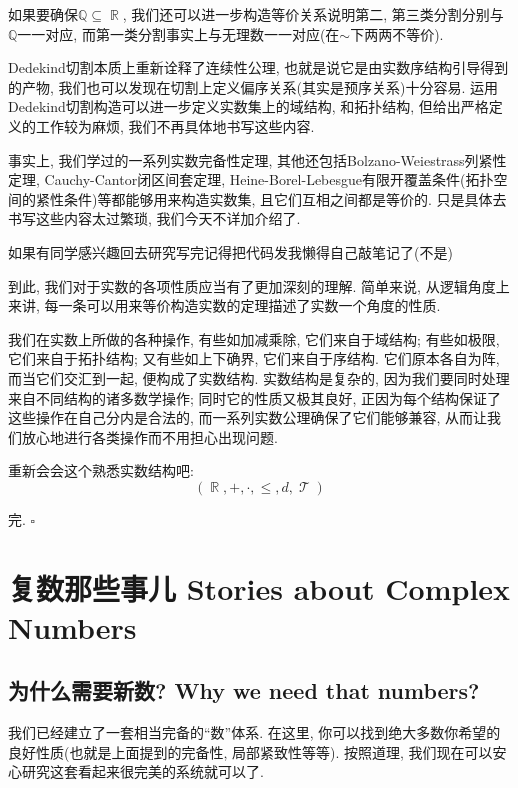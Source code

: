 \documentclass[UTF8]{ctexart}
\newcommand{\<}{\langle}
\renewcommand{\>}{\rangle}
\DeclareMathOperator{\R}{\mathbb{R}}
\DeclareMathOperator{\T}{\mathcal{T}}
\begin{document}
            如果要确保$\mathbb{Q}\subseteq\R$, 我们还可以进一步构造等价关系说明第二, 第三类分割分别与$\mathbb{Q}$一一对应, 而第一类分割事实上与无理数一一对应(在$\sim$下两两不等价). 

            Dedekind切割本质上重新诠释了连续性公理, 也就是说它是由实数序结构引导得到的产物, 我们也可以发现在切割上定义偏序关系(其实是预序关系)十分容易. 运用Dedekind切割构造可以进一步定义实数集上的域结构, 和拓扑结构, 但给出严格定义的工作较为麻烦, 我们不再具体地书写这些内容. 

            事实上, 我们学过的一系列实数完备性定理, 其他还包括Bolzano-Weiestrass列紧性定理, Cauchy-Cantor闭区间套定理, Heine-Borel-Lebesgue有限开覆盖条件(拓扑空间的紧性条件)等都能够用来构造实数集, 且它们互相之间都是等价的. 只是具体去书写这些内容太过繁琐, 我们今天不详加介绍了. 

            {\scriptsize 如果有同学感兴趣回去研究写完记得把代码发我懒得自己敲笔记了(不是)}

            到此, 我们对于实数的各项性质应当有了更加深刻的理解. 简单来说, 从逻辑角度上来讲, 每一条可以用来等价构造实数的定理描述了实数一个角度的性质. 
            
            我们在实数上所做的各种操作, 有些如加减乘除, 它们来自于域结构; 有些如极限, 它们来自于拓扑结构; 又有些如上下确界, 它们来自于序结构. 它们原本各自为阵, 而当它们交汇到一起, 便构成了实数结构. 实数结构是复杂的, 因为我们要同时处理来自不同结构的诸多数学操作; 同时它的性质又极其良好, 正因为每个结构保证了这些操作在自己分内是合法的, 而一系列实数公理确保了它们能够兼容, 从而让我们放心地进行各类操作而不用担心出现问题. 

            重新会会这个熟悉实数结构吧: 
            \[(\R,+,\cdot,\leq,d,\T)\]
            
            \begin{center}
                完. $\square$
            \end{center}

    \section{复数那些事儿 Stories about Complex Numbers}

        \subsection{为什么需要新数? Why we need that numbers?}

            我们已经建立了一套相当完备的``数''体系. 在这里, 你可以找到绝大多数你希望的良好性质(也就是上面提到的完备性, 局部紧致性等等). 按照道理, 我们现在可以安心研究这套看起来很完美的系统就可以了. 
\end{document}
